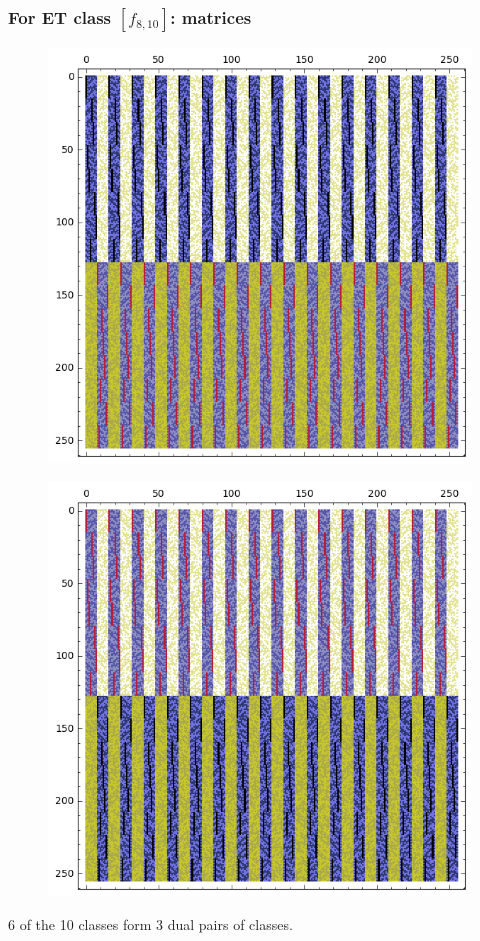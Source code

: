 \documentclass[pdf,sprung,slideColor,nocolorBG]{beamer}
\begin{document}
\begin{frame}
\frametitle{For ET class $[f_{8,10}]$: matrices}
\begin{figure}
\centering
\begin{minipage}{.48\textwidth}
  \centering
  \includegraphics[width=.9\linewidth]{../matrix_plot/c8_10_bent_cayley_graph_index_matrix.png}
  \label{fig:c8_10_bent_cayley_graph_index_matrix}
\end{minipage}
\begin{minipage}{.48\textwidth}
  \centering
  \includegraphics[width=.9\linewidth]{../matrix_plot/c8_10_dual_cayley_graph_index_matrix.png}
  \label{fig:c8_10_dual_cayley_graph_index_matrix}
\end{minipage}%
\end{figure}
6 of the 10 classes form 3 dual pairs of classes.
\end{frame}
\end{document}
